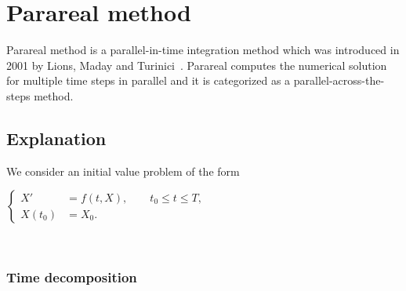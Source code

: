 \section{Parareal method}
	
Parareal method is a parallel-in-time integration method which was introduced in 2001 by Lions, Maday and Turinici~\cite{partie2_ref1}. Parareal computes the numerical solution for multiple time steps in parallel and it is categorized as a parallel-across-the-steps method.

\subsection{Explanation}

We consider an initial value problem of the form \\
\begin{minipage}{\linewidth}
	\centering
	$\left\{\begin{aligned}
		X'&=f(t,X), \qquad t_0\le t\le T, \\
		X(t_0)&=X_0.
	\end{aligned}\right.$ \\
\end{minipage} \\

\subsubsection{Time decomposition}

